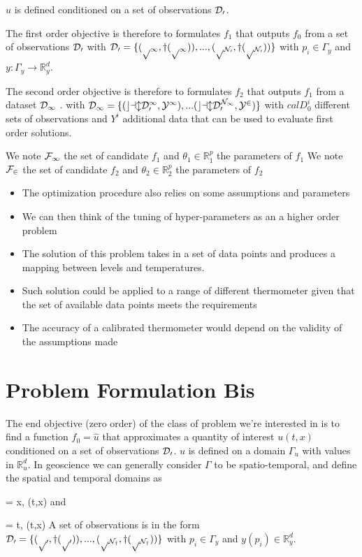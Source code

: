 \begin{bibunit}
{{   $u$ is defined 
  conditioned on a set of observations $\cal{D}_0$.

  The first order objective is therefore to formulates $f_1$ that outputs $f_0$ from  a set of observations $\cal{D}_0$
  with $\cal{D}_0 = \{(p_1, y(p_1)), ..., (p_{N_0}, y(p_{N_0})) \}$ with  $p_i \in \Gamma_y$ and $y: \Gamma_y \to \mathbb{R}^d_y$.

  The second order objective is therefore to formulates $f_2$ that outputs $f_1$ from a dataset $\cal{D}_1$ .
  with $\cal{D}_1 = \{(cal{D}_0^1, Y^1),... (cal{D}_0^{N_1}, Y^2) \}$ with  $cal{D}_0^{i}$ different sets of observations and $Y^i$ additional data that can be used to evaluate first order solutions.

  We note $\cal{F}_1$  the set of candidate $f_1$ and $\theta_1 \in \mathbb{R}^p_1$ the parameters of $f_1$
  We note $\cal{F}_2$  the set of candidate $f_2$ and $\theta_2 \in \mathbb{R}^p_2$ the parameters of $f_2$







\begin{itemize}
  \item The optimization procedure also relies on some assumptions and parameters
  \item We can then think of the tuning of hyper-parameters as an a higher order problem
  \item The solution of this problem takes in a set of data points and produces a mapping between levels and temperatures.
  \item Such solution could be applied to a range of different thermometer given that the set of available data points meets the requirements
  \item The accuracy of a calibrated thermometer would depend on the validity of the assumptions made
\end{itemize}

\section{Problem Formulation Bis}
\label{sec:chap1_problem_formbis}

  The end objective (zero order) of the class of problem we're interested in is to find a function $f_0=\hat{u}$  that approximates a quantity of interest $u(t, x)$ conditioned on a set of observations $\cal{D}_0$.
   $u$ is defined on a domain $\Gamma_u$ with values in $\mathbb{R}^d_u$.
  In geoscience we can generally consider $\Gamma$ to be spatio-temporal, and define the spatial and temporal domains  as {\Omega = {x, (t,x) \in \Gamma} and {\Tau = {t, (t,x) \in \Gamma}
  A set of observations is in the form $\cal{D}_0 = \{(p_0, y(p_0)), ..., (p_{N_y}, y(p_{N_y})) \}$ with  $p_i \in \Gamma_y$ and $y(p_i) \in \mathbb{R}^d_y$.


}}}}
\end{bibunit}
